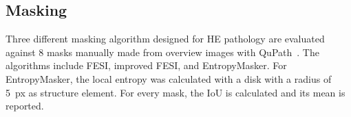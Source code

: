 \subsection{Masking}\label{subsec:masking}
Three different masking algorithm designed for HE pathology are evaluated against 8 masks manually made from overview images with QuPath~\cite{Bankhead2017}.
The algorithms include FESI, improved FESI, and EntropyMasker.
For EntropyMasker, the local entropy was calculated with a disk with a radius of \qty{5}{px} as structure element.
For every mask, the IoU is calculated and its mean is reported.
